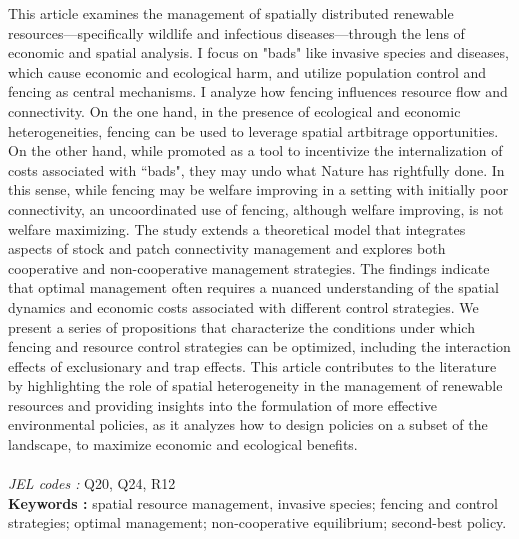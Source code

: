 \begin{minipage}{0.9\textwidth}

This article examines the management of spatially distributed renewable resources—specifically wildlife and infectious diseases—through the lens of economic and spatial analysis. I focus on "bads" like invasive species and diseases, which cause economic and ecological harm, and utilize population control and fencing as central mechanisms. I analyze how fencing influences resource flow and connectivity. On the one hand, in the presence of ecological and economic heterogeneities, fencing can be used to leverage spatial artbitrage opportunities. On the other hand, while promoted as a tool to incentivize the internalization of costs associated with ``bads", they may undo what Nature has rightfully done. In this sense, while fencing may be welfare improving in a setting with initially poor connectivity, an uncoordinated use of fencing, although welfare improving, is not welfare maximizing. The study extends a theoretical model \citep{costello_private_2017} that integrates aspects of stock and patch connectivity management and explores both cooperative and non-cooperative management strategies. The findings indicate that optimal management often requires a nuanced understanding of the spatial dynamics and economic costs associated with different control strategies. We present a series of propositions that characterize the conditions under which fencing and resource control strategies can be optimized, including the interaction effects of exclusionary and trap effects. This article contributes to the literature by highlighting the role of spatial heterogeneity in the management of renewable resources and providing insights into the formulation of more effective environmental policies, as it analyzes how to design policies on a subset of the landscape, to maximize economic and ecological benefits. \\\\
\textit{JEL codes :} Q20, Q24, R12\\
\textbf{Keywords :} spatial resource management, invasive species; fencing and control strategies; optimal management; non-cooperative equilibrium; second-best policy.
\end{minipage}


\clearpage

{\footnotesize


}